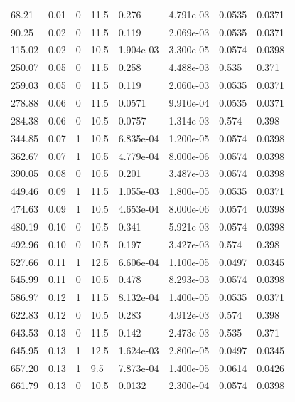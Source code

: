 \documentclass[preview]{standalone}
\begin{document}
{{\begin{tabular}{L{1.2cm}C{1.2cm} C{0.3cm}C{0.5cm} C{1.4cm}C{1.4cm} C{1.4cm}C{1.4cm}}
  68.21  &  0.01  & 0     & 11.5 &  0.276  & 4.791e-03  & 0.0535 &  0.0371   \\ 
  90.25  &  0.02  & 0     & 11.5 &  0.119  & 2.069e-03  & 0.0535 &  0.0371   \\ 
  115.02  &  0.02  & 0     & 10.5 &  1.904e-03  & 3.300e-05  & 0.0574 &  0.0398   \\ 
  250.07  &  0.05  & 0     & 11.5 &  0.258  & 4.488e-03  & 0.535 &  0.371   \\ 
  259.03  &  0.05  & 0     & 11.5 &  0.119  & 2.060e-03  & 0.0535 &  0.0371   \\ 
  278.88  &  0.06  & 0     & 11.5 &  0.0571  & 9.910e-04  & 0.0535 &  0.0371   \\ 
  284.38  &  0.06  & 0     & 10.5 &  0.0757  & 1.314e-03  & 0.574 &  0.398   \\ 
  344.85  &  0.07  & 1     & 10.5 &  6.835e-04  & 1.200e-05  & 0.0574 &  0.0398   \\ 
  362.67  &  0.07  & 1     & 10.5 &  4.779e-04  & 8.000e-06  & 0.0574 &  0.0398   \\ 
  390.05  &  0.08  & 0     & 10.5 &  0.201  & 3.487e-03  & 0.0574 &  0.0398   \\ 
  449.46  &  0.09  & 1     & 11.5 &  1.055e-03  & 1.800e-05  & 0.0535 &  0.0371   \\ 
  474.63  &  0.09  & 1     & 10.5 &  4.653e-04  & 8.000e-06  & 0.0574 &  0.0398   \\ 
  480.19  &  0.10  & 0     & 10.5 &  0.341  & 5.921e-03  & 0.0574 &  0.0398   \\ 
  492.96  &  0.10  & 0     & 10.5 &  0.197  & 3.427e-03  & 0.574 &  0.398   \\ 
  527.66  &  0.11  & 1     & 12.5 &  6.606e-04  & 1.100e-05  & 0.0497 &  0.0345   \\ 
  545.99  &  0.11  & 0     & 10.5 &  0.478  & 8.293e-03  & 0.0574 &  0.0398   \\ 
  586.97  &  0.12  & 1     & 11.5 &  8.132e-04  & 1.400e-05  & 0.0535 &  0.0371   \\ 
  622.83  &  0.12  & 0     & 10.5 &  0.283  & 4.912e-03  & 0.574 &  0.398   \\ 
  643.53  &  0.13  & 0     & 11.5 &  0.142  & 2.473e-03  & 0.535 &  0.371   \\ 
  645.95  &  0.13  & 1     & 12.5 &  1.624e-03  & 2.800e-05  & 0.0497 &  0.0345   \\ 
  657.20  &  0.13  & 1     & 9.5 &  7.873e-04  & 1.400e-05  & 0.0614 &  0.0426   \\ 
  661.79  &  0.13  & 0     & 10.5 &  0.0132  & 2.300e-04  & 0.0574 &  0.0398   \\ 

\end{tabular}}}
\end{document}
